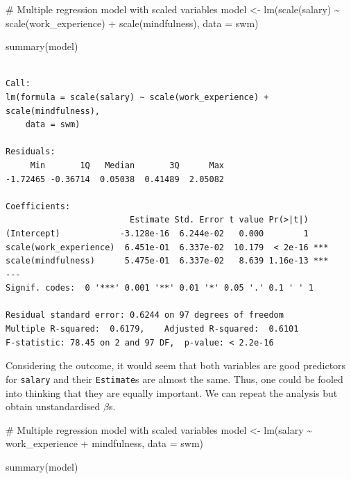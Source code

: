 \documentclass[
  letterpaper,
  DIV=11,
  numbers=noendperiod]{scrreprt}
\newenvironment{Shaded}{\begin{snugshade}}{\end{snugshade}}
\newcommand{\AttributeTok}[1]{\textcolor[rgb]{0.40,0.45,0.13}{#1}}
\newcommand{\CommentTok}[1]{\textcolor[rgb]{0.37,0.37,0.37}{#1}}
\newcommand{\FunctionTok}[1]{\textcolor[rgb]{0.28,0.35,0.67}{#1}}
\newcommand{\NormalTok}[1]{\textcolor[rgb]{0.00,0.23,0.31}{#1}}
\newcommand{\OtherTok}[1]{\textcolor[rgb]{0.00,0.23,0.31}{#1}}
\newcommand{\SpecialCharTok}[1]{\textcolor[rgb]{0.37,0.37,0.37}{#1}}
\begin{document}
\begin{Shaded}
\begin{Highlighting}[]
\CommentTok{\# Multiple regression model with scaled variables}
\NormalTok{model }\OtherTok{\textless{}{-}} \FunctionTok{lm}\NormalTok{(}\FunctionTok{scale}\NormalTok{(salary) }\SpecialCharTok{\textasciitilde{}} \FunctionTok{scale}\NormalTok{(work\_experience) }\SpecialCharTok{+} \FunctionTok{scale}\NormalTok{(mindfulness),}
            \AttributeTok{data =}\NormalTok{ swm)}

\FunctionTok{summary}\NormalTok{(model)}
\end{Highlighting}
\end{Shaded}

\begin{verbatim}

Call:
lm(formula = scale(salary) ~ scale(work_experience) + scale(mindfulness), 
    data = swm)

Residuals:
     Min       1Q   Median       3Q      Max 
-1.72465 -0.36714  0.05038  0.41489  2.05082 

Coefficients:
                         Estimate Std. Error t value Pr(>|t|)    
(Intercept)            -3.128e-16  6.244e-02   0.000        1    
scale(work_experience)  6.451e-01  6.337e-02  10.179  < 2e-16 ***
scale(mindfulness)      5.475e-01  6.337e-02   8.639 1.16e-13 ***
---
Signif. codes:  0 '***' 0.001 '**' 0.01 '*' 0.05 '.' 0.1 ' ' 1

Residual standard error: 0.6244 on 97 degrees of freedom
Multiple R-squared:  0.6179,    Adjusted R-squared:  0.6101 
F-statistic: 78.45 on 2 and 97 DF,  p-value: < 2.2e-16
\end{verbatim}

Considering the outcome, it would seem that both variables are good
predictors for \texttt{salary} and their \texttt{Estimate}s are almost
the same. Thus, one could be fooled into thinking that they are equally
important. We can repeat the analysis but obtain unstandardised
\(\beta\)s.

\begin{Shaded}
\begin{Highlighting}[]
\CommentTok{\# Multiple regression model with scaled variables}
\NormalTok{model }\OtherTok{\textless{}{-}} \FunctionTok{lm}\NormalTok{(salary }\SpecialCharTok{\textasciitilde{}}\NormalTok{ work\_experience }\SpecialCharTok{+}\NormalTok{ mindfulness,}
            \AttributeTok{data =}\NormalTok{ swm)}

\FunctionTok{summary}\NormalTok{(model)}
\end{Highlighting}
\end{Shaded}
\end{document}

